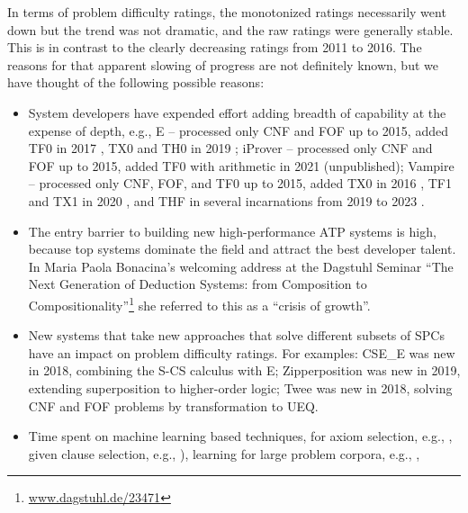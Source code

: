 \documentclass[runningheads]{llncs}
\begin{document}
In terms of problem difficulty ratings, the monotonized ratings necessarily went down but the 
trend was not dramatic, and the raw ratings were generally stable.
This is in contrast to the clearly decreasing ratings from 2011 to 2016.
The reasons for that apparent slowing of progress are not definitely known, but we have thought of 
the following possible reasons:
\begin{itemize}
\item System developers have expended effort adding breadth of capability at the expense of 
      depth, e.g., 
      E -- processed only CNF and FOF up to 2015, added TF0 in 2017 \cite{SCV19}, TX0 and TH0 
           in 2019 \cite{VB+19};
      iProver -- processed only CNF and FOF up to 2015, added TF0 with arithmetic in 2021 
           (unpublished);
      Vampire -- processed only CNF, FOF, and TF0 up to 2015, added TX0 in 2016 \cite{KK+16}, 
           TF1 and TX1 in 2020 \cite{BR20-IJCAR}, and THF in several incarnations from 2019 to 
           2023 \cite{BR19,Bha20-Thesis,BRS23}.
\item The entry barrier to building new high-performance ATP systems is high, because top systems
      dominate the field and attract the best developer talent.
      In Maria Paola Bonacina's welcoming address at the Dagstuhl Seminar ``The Next Generation 
      of Deduction Systems: from Composition to Compositionality''\footnote{%
      \href{https://www.dagstuhl.de/23471}{www.dagstuhl.de/23471}} she referred to this as a
     ``crisis of growth''.
\item New systems that take new approaches that solve different subsets of SPCs have an 
      impact on problem difficulty ratings.
      For examples:
      CSE\_E \cite{XL+18} was new in 2018, combining the S-CS calculus with E;
      Zipperposition \cite{BB+21} was new in 2019, extending superposition to higher-order logic;
      Twee \cite{Sma21} was new in 2018, solving CNF and FOF problems by transformation to UEQ.
\item Time spent on machine learning based techniques, for axiom selection, e.g., 
      \cite{Urb06,KB14}, given clause selection, e.g., \cite{JU17-CICM,CA+21,AA+22-ML,MS23}), 
      learning for large problem corpora, e.g., \cite{KM+14,JU19,BL+19-ICML}, 

\end{itemize}
\end{document}
